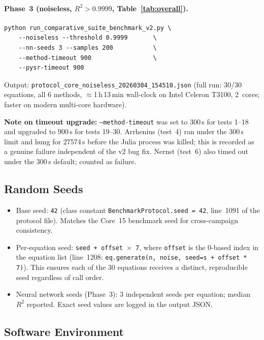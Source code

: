 \documentclass[twoside,11pt]{article}
\begin{document}
\paragraph{Phase~3 (noiseless, $R^2>0.9999$, Table~\ref{tab:overall}).}
\begin{verbatim}
python run_comparative_suite_benchmark_v2.py \
    --noiseless --threshold 0.9999       \
    --nn-seeds 3 --samples 200           \
    --method-timeout 900                 \
    --pysr-timeout 900
\end{verbatim}
Output: \texttt{protocol\_core\_noiseless\_20260304\_154510.json}
(full run: 30/30 equations, all 6 methods, $\approx$1\,h\,13\,min wall-clock
on Intel Celeron T3100, 2~cores; faster on modern multi-core hardware).

\textbf{Note on timeout upgrade:} \texttt{--method-timeout} was set to 300\,s
for tests 1--18 and upgraded to 900\,s for tests 19--30. Arrhenius (test~4)
ran under the 300\,s limit and hung for 27574\,s before the Julia process was
killed; this is recorded as a genuine failure independent of the v2 bug fix.
Nernst (test~6) also timed out under the 300\,s default; counted as failure.

\subsection*{Random Seeds}

\begin{itemize}
  \item Base seed: \texttt{42} (class constant
    \texttt{BenchmarkProtocol.seed = 42}, line~1091 of the protocol file).
    Matches the Core~15 benchmark seed for cross-campaign consistency.
  \item Per-equation seed: \texttt{seed + offset $\times$ 7}, where
    \texttt{offset} is the 0-based index in the equation list
    (line~1208: \texttt{eq.generate(n, noise, seed=s + offset * 7)}).
    This ensures each of the 30 equations receives a distinct, reproducible
    seed regardless of call order.
  \item Neural network seeds (Phase~3): 3 independent seeds per equation;
    median $R^2$ reported. Exact seed values are logged in the output JSON.
\end{itemize}

\subsection*{Software Environment}
\end{document}
